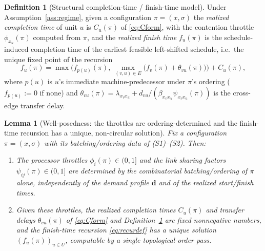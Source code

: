 \documentclass{amsart}
\newtheorem{lemma}{Lemma}
\theoremstyle{definition}
\newtheorem{definition}{Definition}
\begin{document}
\begin{definition}[Structural completion-time / finish-time model]\label{def:struct}
Under Assumption~\ref{ass:regime}, given a configuration $\pi=(x,\sigma)$ the
\emph{realized completion time} of unit $u$ is $C_u(\pi)$ of \eqref{eq:Cform},
with the contention throttle $\phi_{x_u}(\pi)$ computed from $\pi$, and the
\emph{realized finish time} $f_u(\pi)$ is the schedule-induced completion time
of the earliest feasible left-shifted schedule, i.e.\ the unique fixed point of
the recursion
\begin{equation}\label{eq:recurdef}
f_u(\pi)=\max\Big(f_{p(u)}(\pi),\ \max_{(v,u)\in E}\big(f_v(\pi)+\theta_{vu}(\pi)\big)\Big)+C_u(\pi),
\end{equation}
where $p(u)$ is $u$'s immediate machine-predecessor under $\pi$'s ordering
($f_{p(u)}:=0$ if none) and $\theta_{vu}(\pi)=\lambda_{x_vx_u}+
d_{vu}/(\beta_{x_vx_u}\psi_{x_vx_u}(\pi))$ is the cross-edge transfer delay.
\end{definition}

\begin{lemma}[Well-posedness: the throttles are ordering-determined and the
finish-time recursion has a unique, non-circular solution]\label{lem:wellposed}
Fix a configuration $\pi=(x,\sigma)$ with its batching/ordering data of (S1)--(S2).
Then:
\begin{enumerate}
\item[\textup{(i)}] The processor throttles $\phi_i(\pi)\in(0,1]$ and the link
sharing factors $\psi_{ij}(\pi)\in(0,1]$ are determined by the
\emph{combinatorial} batching/ordering of $\pi$ alone, independently of the
demand profile $\mathbf d$ and of the realized start/finish times.
\item[\textup{(ii)}] Given these throttles, the realized completion times
$C_u(\pi)$ and transfer delays $\theta_{vu}(\pi)$ of \eqref{eq:Cform} and
Definition~\ref{def:struct} are fixed nonnegative numbers, and the finish-time
recursion \eqref{eq:recurdef} has a unique solution $(f_u(\pi))_{u\in U}$,
computable by a single topological-order pass.
\end{enumerate}
\end{lemma}
\end{document}
